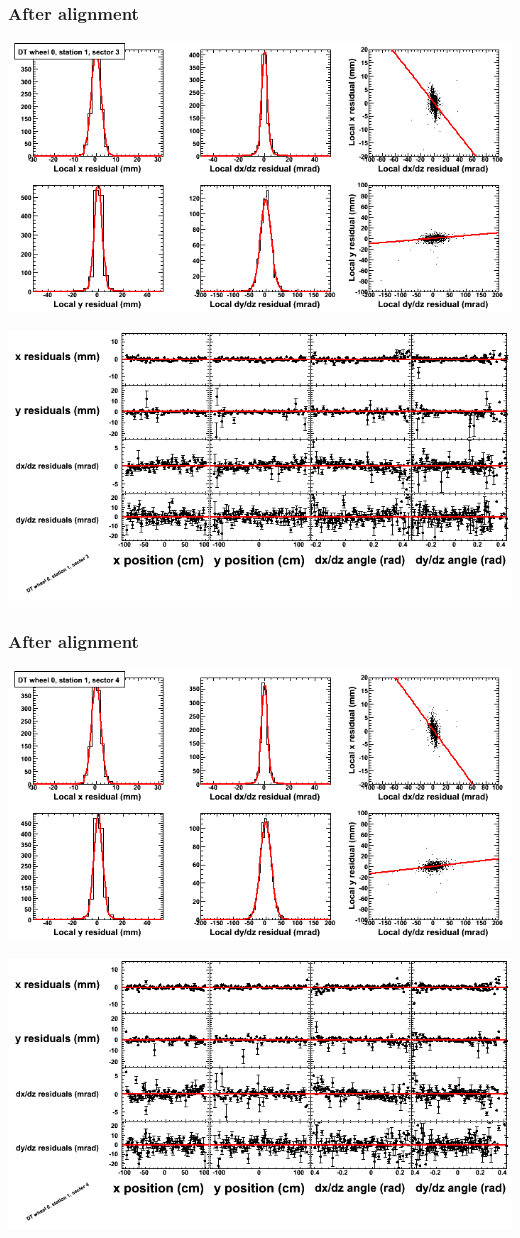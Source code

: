 \documentclass[compress]{beamer}
\begin{document}
\begin{frame}
\frametitle{After alignment}
\includegraphics[width=0.7\linewidth]{NOV4_fitfunctions/MBwhCst1sec03_bellcurves.png}

\includegraphics[width=0.7\linewidth]{NOV4_fitfunctions/MBwhCst1sec03_polynomials.png}
\end{frame}

\begin{frame}
\frametitle{After alignment}
\includegraphics[width=0.7\linewidth]{NOV4_fitfunctions/MBwhCst1sec04_bellcurves.png}

\includegraphics[width=0.7\linewidth]{NOV4_fitfunctions/MBwhCst1sec04_polynomials.png}
\end{frame}
\end{document}
